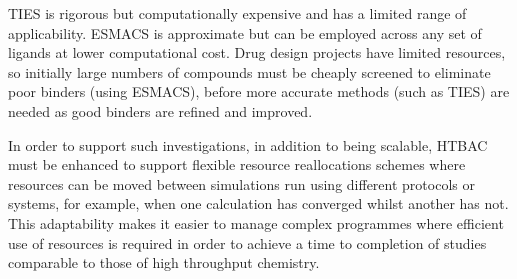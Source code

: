 
TIES is rigorous but computationally expensive and has a limited range of 
applicability.
ESMACS is approximate but can be employed across any set of ligands at lower computational cost.
Drug design projects have limited resources,
so initially large numbers of compounds must be cheaply screened
to eliminate poor binders (using ESMACS), 
before more accurate methods (such as
TIES) are needed as good binders are refined and improved. %

In order to support such
investigations, in addition to being scalable, HTBAC must be enhanced to
support flexible resource reallocations schemes where resources can be moved
between simulations run using different protocols or systems, for example,
when one calculation has converged whilst another has not. This adaptability
makes it easier to manage complex programmes where efficient use of resources
is required in order to achieve a time to completion of studies comparable to
those of high throughput chemistry. 


